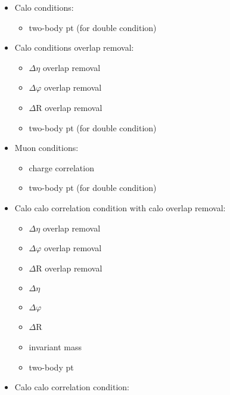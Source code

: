 \begin{itemize}
\item Calo conditions:
\begin{itemize}
\item two-body pt (for double condition)
\end{itemize}
\item Calo conditions overlap removal:
\begin{itemize}
\item $\Delta\eta$ overlap removal
\item $\Delta\varphi$ overlap removal
\item $\Delta$R overlap removal
\item two-body pt (for double condition)
\end{itemize}
\item Muon conditions:
\begin{itemize}
\item charge correlation
\item two-body pt (for double condition)
\end{itemize}
\item Calo calo correlation condition with calo overlap removal:
\begin{itemize}
\item $\Delta\eta$ overlap removal
\item $\Delta\varphi$ overlap removal
\item $\Delta$R overlap removal
\item $\Delta\eta$
\item $\Delta\varphi$
\item $\Delta$R
\item invariant mass
\item two-body pt
\end{itemize} 
\item Calo calo correlation condition:
\begin{itemize}

\end{itemize}
\end{itemize}
